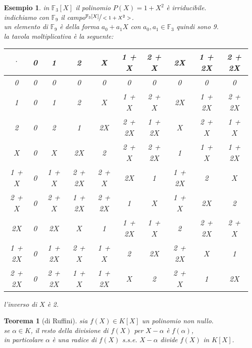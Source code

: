 \documentclass[a4paper,12pt]{article}
\theoremstyle{def}
\theoremstyle{prop}
\theoremstyle{esempio}
\newtheorem*{example}{Esempio}
\theoremstyle{dimostrazione}
\theoremstyle{teo}
\newtheorem*{teorema}{Teorema}
\theoremstyle{osservazione}
\begin{document}
\begin{example}
    in \(\mathbb{F}_3[X]\) il polinomio \(P(X) = 1 + X^2\) è irriducibile.\\
    indichiamo con \(\mathbb{F}_9\) il campo\(\sfrac{\mathbb{F}_3[X]}{<1 + X^2>}\).\\
    un elemento di \(\mathbb{F}_9\) è della forma \(a_0 + a_1X\) con \(a_0,a_1 \in \mathbb{F}_3\) quindi sono 9.\\
    la tavola moltiplicativa è la seguente:
    \begin{center}
        \begin{tabular}{c|ccccccccc}
            \(\cdot\) & 0 & 1 & 2 & X & 1 + X & 2 + X & 2X & 1 + 2X & 2 + 2X\\
            \hline
            0 & 0 & 0 & 0 & 0 & 0 & 0 & 0 &0 & 0 \\
            1 & 0 & 1 & 2 & X & 1 + X & 2 + X & 2X & 1 + 2X & 2 + 2X \\
            2 & 0 & 2 & 1 & 2X & 2 + 2X & 1 + 2X & X & 2 + X & 1 + X \\
            X & 0 & X & 2X & 2 & 2 + X & 2 + 2X & 1 & 1 + X & 1 + 2X \\
            1 + X & 0 & 1 + X & 2 + 2X & 2 + X & 2X & 1 & 1 + 2X & 2 & X \\
            2 + X & 0 & 2 + X & 1 + 2X & 2 + 2X & 1 & X & 1 + X & 2X & 2 \\
            2X & 0 & 2X & X & 1 & 1 + 2X & 1 + X & 2 & 2 + 2X & 2 + X \\
            1 + 2X & 0 & 1 + 2X & 2 + X & 1 + X & 2 & 2X & 2 + 2X & X & 1 \\
            2 + 2X & 0 & 2 + 2X & 1 + X & 1 + 2X & X & 2 & 2 + X & 1 & 2X \\
        \end{tabular}
    \end{center}
    l'inverso di \(X\) è 2.\\
\end{example}

\begin{teorema}[di Ruffini]
    sia \(f(X) \in K[X]\) un polinomio non nullo.\\
    se \(\alpha \in K\), il resto della divisione di \(f(X)\) per \(X - \alpha\) è \(f(\alpha)\),\\
    in particolare \(\alpha\) è una radice di \(f(X)\) s.s.e. \(X - \alpha\) divide \(f(X)\) in \(K[X]\).\\
\end{teorema}
\end{document}

